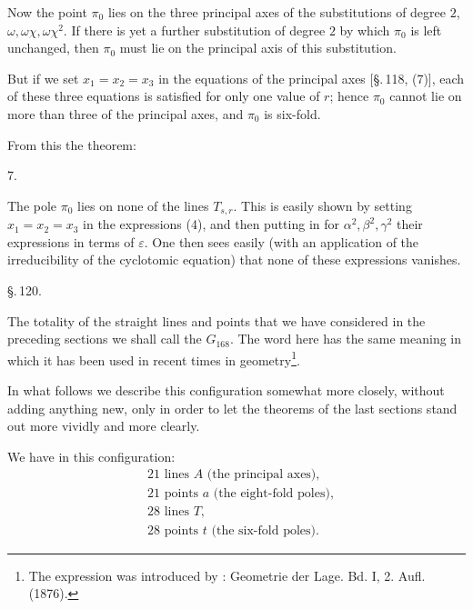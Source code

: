 Now the point $\pi_0$ lies on the three principal axes of the substitutions of degree $2$, $\omega, \omega\chi, \omega\chi^2$. If there is yet a further substitution of degree $2$ by which $\pi_0$ is left unchanged, then $\pi_0$ must lie on the principal axis of this substitution.

But if we set $x_1 = x_2 = x_3$ in the equations of the principal axes [\S.\,118, (7)], each of these three equations is satisfied for only one value of $r$; hence $\pi_0$ cannot lie on more than three of the principal axes, and $\pi_0$ is six-fold.

From this the theorem:

7. 

The pole $\pi_0$ lies on none of the lines $T_{s,r}$. This is easily shown by setting $x_1 = x_2 = x_3$ in the expressions (4), and then putting in for $\alpha^2, \beta^2, \gamma^2$ their expressions in terms of $\varepsilon$. One then sees easily (with an application of the irreducibility of the cyclotomic equation) that none of these expressions vanishes.

\S.\,120.


The totality of the straight lines and points that we have considered in the preceding sections we shall call the  $G_{168}$. The word here has the same meaning in which it has been used in recent times in geometry\footnote{The expression was introduced by : \glqq{}Geometrie der Lage.\grqq{} Bd. I, 2. Aufl. (1876).}.

In what follows we describe this configuration somewhat more closely, without adding anything new, only in order to let the theorems of the last sections stand out more vividly and more clearly.

We have in this configuration:
\[
\begin{aligned}
&\text{21 lines } A \text{ (the principal axes)}, \\
&\text{21 points } a \text{ (the eight-fold poles)}, \\
&\text{28 lines } T, \\
&\text{28 points } t \text{ (the six-fold poles)}.
\end{aligned}
\]
